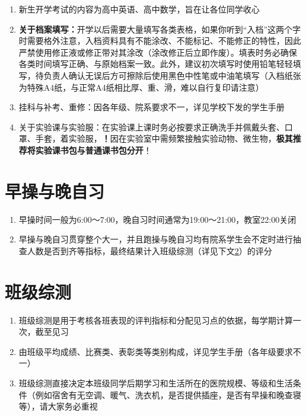 \begin{enumerate}
    \item 新生开学考试\footnotemark 的内容为高中英语、高中数学，旨在让各位同学收心
    \item \textbf{关于档案填写：}开学以后需要大量填写各类表格，如果你听到“入档”这两个字时需要格外注意，入档资料具有不能涂改、不能标记、不能修正的特性，因此严禁使用修正液或修正带对其涂改（涂改修正后立即作废）。填表时务必确保各类时间填写正确、与原始档案一致。此外，建议初次填写时使用铅笔轻轻填写，待负责人确认无误后方可擦除后使用黑色中性笔或中油笔填写（入档纸张为特殊A4纸，与正常A4纸相比厚、重、滑，难以自行复印请注意）
    \item 挂科与补考、重修：因各年级、院系要求不一，详见学校下发的学生手册
    \item 关于实验课与实验服：在实验课上课时务必按要求正确洗手并佩戴头套、口罩、手套，着实验服，\textbf{！}因在实验室中需频繁接触实验动物、微生物，\textbf{极其推荐将实验课书包与普通课书包分开}！
          \label{schoolbag}
\end{enumerate}

\section[早操与晚自习]{早操与晚自习}
\begin{enumerate}
    \item 早操时间一般为6:00～7:00，晚自习时间通常为19:00～21:00，教室22:00关闭
    \item 早操与晚自习贯穿整个大一\footnotemark，并且跑操与晚自习均有院系学生会不定时进行抽查人数是否到齐等指标，最终结果计入班级综测（详见下文\uline{\ref{class_evaluation}}）的评分
\end{enumerate}

\section[班级综测]{班级综测}
\label{class_evaluation}
\begin{enumerate}
    \item 班级综测是用于考核各班表现的评判指标和分配见习点的依据\footnotemark，每学期计算一次，截至见习
    \item 由班级平均成绩、比赛类、表彰类等类别构成，详见学生手册（各年级要求不一）
    \item 班级综测直接决定本班级同学后期学习和生活所在的医院规模、等级和生活条件（例如宿舍有无空调、暖气、洗衣机，是否提供插座，是否有早操和晚查寝\footnotemark 等），请大家务必重视
\end{enumerate}

